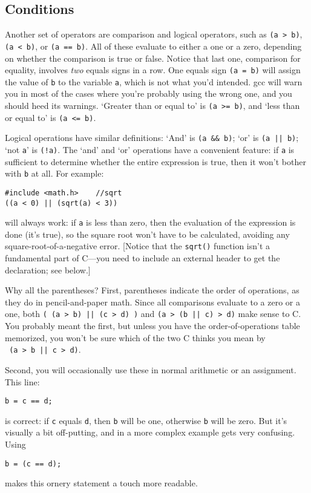 \documentclass[12pt]{article}
\makeatletter
\def\ttindex#1{\index{#1@{\tt #1}}}
\makeatother
\begin{document}
\subsection{Conditions} 	
\label{forloops}    
\ttindex{<} \ttindex{>} \ttindex{==}
Another set of operators are comparison and logical operators, such as {\tt (a > b)},
{\tt (a < b)}, or {\tt (a == b)}. All of these evaluate to either a one or a zero, depending on whether the
comparison is true or false. Notice that last one, comparison for equality, involves {\sl two} equals
signs in a row. One equals sign {\tt (a = b)} will assign the value of {\tt b} to the variable {\tt a}, which is not what
you'd intended. gcc will warn you in most of the cases where you're
probably using the wrong one, and you should heed its warnings. `Greater than or equal to' is {\tt (a >=
b)}, and `less than or equal to' is {\tt (a <= b)}.

Logical operations have similar definitions: \ttindex{\&\&} \ttindex{"|"|} 
  
`And' is {\tt (a \&\& b)}; `or' is {\tt (a || b)}; `not {\tt a}' is {\tt (!a)}.
The `and' and `or' operations have a convenient feature: if {\tt a} is sufficient to determine whether
the entire expression is true, then it won't bother with {\tt b} at all. For example:
\begin{verbatim}
#include <math.h>    //sqrt
((a < 0) || (sqrt(a) < 3))
\end{verbatim}
will always work: if {\tt a} is less than zero, then the evaluation of the expression is done (it's true),
so the square root won't have to be calculated, avoiding any
square-root-of-a-negative error. [Notice that the {\tt sqrt()} function
isn't a fundamental part of C---you need to include an external header to get the declaration; see below.]

Why all the parentheses? First, parentheses indicate the order of operations, as they do in pencil-and-paper
math. Since all comparisons evaluate to a zero or a one, both {\tt ( (a > b) || (c > d) )} and 
{\tt (a > (b || c) > d)} make sense to C. You probably meant the first, but unless you have
the order-of-operations table memorized, you won't be sure which of the two C thinks you mean by\\ {\tt
(a > b || c > d)}.

Second, you will occasionally use these in normal arithmetic or an assignment. This line:
\begin{verbatim}
b = c == d;
\end{verbatim}
is correct: if {\tt c} equals {\tt d}, then {\tt b} will be one, otherwise {\tt b} will be zero. But
it's visually a bit off-putting, and in a more complex example gets very confusing. Using
\begin{verbatim}
b = (c == d);
\end{verbatim}
makes this ornery statement a touch more readable.
\end{document}
